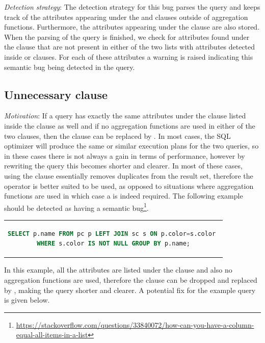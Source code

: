 \noindent \emph{Detection strategy}: The detection strategy for this bug parses the query and keeps track of the attributes appearing under the  and  clauses outside of aggregation functions. Furthermore, the attributes appearing under the  clause are also stored. When the parsing of the query is finished, we check for attributes found under the  clause that are not present in either of the two lists with attributes detected inside  or  clauses. For each of these attributes a warning is raised indicating this semantic bug being detected in the query.

\subsection{Unnecessary  clause}
\emph{Motivation}: If a query has exactly the same attributes under the  clause listed inside the  clause as well and if no aggregation functions are used in either of the two clauses, then the  clause can be replaced by . In most cases, the SQL optimizer will produce the same or similar execution plans for the two queries, so in these cases there is not always a gain in terms of performance, however by rewriting the query this becomes shorter and clearer. In most of these cases, using the  clause essentially removes duplicates from the result set, therefore the  operator is better suited to be used, as opposed to situations where aggregation functions are used in which case a  is indeed required. The following example should be detected as having a semantic bug\footnote{\url{https://stackoverflow.com/questions/33840072/how-can-you-have-a-column-equal-all-items-in-a-list}}.

\begin{center}
\begin{tabular}{c}
\begin{lstlisting}[language=SQL]
SELECT p.name FROM pc p LEFT JOIN sc s ON p.color=s.color 
WHERE s.color IS NOT NULL GROUP BY p.name;
\end{lstlisting}
\end{tabular}
\end{center}

In this example, all the  attributes are listed under the  clause and also no aggregation functions are used, therefore the  clause can be dropped and replaced by , making the query shorter and clearer. A potential fix for the example query is given below.

